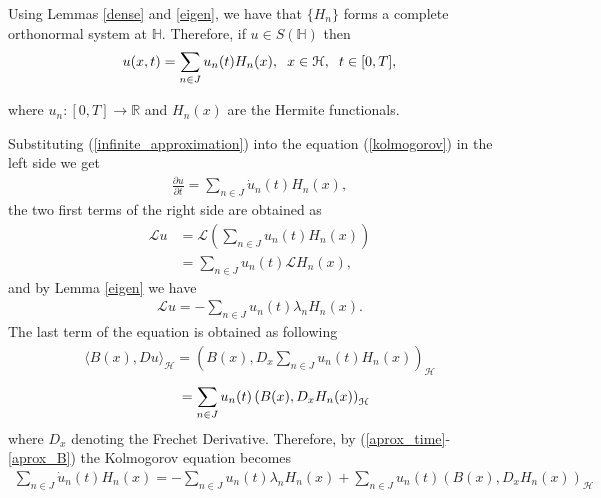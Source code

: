    Using Lemmas \ref{dense} and \ref{eigen}, we have that $\{H_n \}$ forms a complete orthonormal system at $\mathbb{H}$. Therefore, if $u \in S(\mathbb{H})$ then 
   \begin{align}
   	\label{infinite_approximation}
   		u(x, t) = \displaystyle \sum_{n \in J} u_n (t) H_n (x), \hspace{2mm} x \in \mathcal{H}, \hspace{2mm} t \in [0, T],
   \end{align}
   
   where $u_n : [0, T] \rightarrow \mathbb{R}$ and $H_n (x)$ are the Hermite functionals. 
   
   \noindent Substituting (\ref{infinite_approximation}) into the equation (\ref{kolmogorov}) in the left side we get 
    \begin{align}
    \label{aprox_time}
    	\frac{\partial u}{\partial t} = \displaystyle \sum_{n \in J}  \dot{u}_n (t) H_n (x),
    \end{align} 
    the two first terms of the right side are obtained as
    \begin{align*}
    	\mathcal{L} u &= \mathcal{L} \left( \displaystyle \sum_{n \in J} u_n (t) H_n (x) \right) \\
    	&= \sum_{n \in J} u_n (t) \mathcal{L} H_n (x),
    \end{align*}
    and by Lemma \ref{eigen} we have
    \begin{align}
    \label{aprox_J}
    	\mathcal{L} u = - \sum_{n \in J} u_n (t) \lambda_n H_n (x).
    \end{align}	
    The last term of the equation is obtained as following
    \begin{align*}
    	\langle B(x), Du\rangle_{\mathcal{H}} = \left( B(x), D_x \displaystyle \sum_{n \in J} u_n (t) H_n (x)  \right)_{\mathcal{H}} 
    \end{align*}	
    \begin{align}
    \label{aprox_B}
    	\hspace{8mm} = \displaystyle \sum_{n \in J} u_n (t) \left( B(x), D_x H_n (x) \right)_{\mathcal{H}}
    \end{align}
    where $D_x$ denoting the Frechet Derivative. Therefore, by (\ref{aprox_time}-\ref{aprox_B}) the Kolmogorov equation becomes
    \begin{align*}
    	 \displaystyle \sum_{n \in J}  \dot{u}_n (t) H_n (x) = - \sum_{n \in J} u_n (t) \lambda_n H_n (x) + \sum_{n \in J} u_n (t) \left( B(x), D_x H_n (x) \right)_{\mathcal{H}}
    \end{align*}

